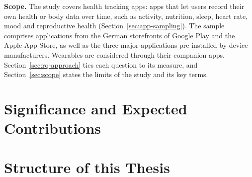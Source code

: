 \noindent\textbf{Scope.} The study covers health tracking apps: apps that let
users record their own health or body data over time, such as activity,
nutrition, sleep, heart rate, mood and reproductive health
(Section~\ref{sec:app-sampling}).
The sample comprises applications from the German storefronts of Google Play and the Apple App Store, as well as the three major applications pre-installed by device manufacturers.
Wearables are considered through their companion apps.
Section~\ref{sec:rq-approach} ties each question to its measure, and
Section~\ref{sec:scope} states the limits of the study and its key terms.

\section{Significance and Expected Contributions}

%
%

\section{Structure of this Thesis} 

